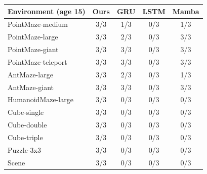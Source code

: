 \begin{tabular}{lcccc}
\toprule
Environment (age 15) & Ours & GRU & LSTM & Mamba\\
\midrule
PointMaze-medium & 3/3 & 1/3 & 0/3 & 1/3\\
PointMaze-large & 3/3 & 2/3 & 0/3 & 3/3\\
PointMaze-giant & 3/3 & 3/3 & 0/3 & 3/3\\
PointMaze-teleport & 3/3 & 3/3 & 0/3 & 3/3\\
AntMaze-large & 3/3 & 2/3 & 0/3 & 1/3\\
AntMaze-giant & 3/3 & 3/3 & 0/3 & 3/3\\
HumanoidMaze-large & 3/3 & 0/3 & 0/3 & 0/3\\
Cube-single & 3/3 & 0/3 & 0/3 & 0/3\\
Cube-double & 3/3 & 0/3 & 0/3 & 0/3\\
Cube-triple & 3/3 & 0/3 & 0/3 & 0/3\\
Puzzle-3x3 & 3/3 & 0/3 & 0/3 & 0/3\\
Scene & 3/3 & 0/3 & 0/3 & 0/3\\
\bottomrule
\end{tabular}
